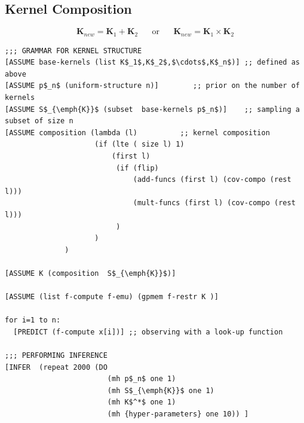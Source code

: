 \documentclass[a0,portrait]{a0poster}
\begin{document}
\begin{multicols}{3}
\subsection*{Kernel Composition}
\begin{equation*}
\mathbf{K}_{new} = \mathbf{K}_1 + \mathbf{K}_2 \;\;\;\;\;\;\text{or}\;\;\;\;\;\; \mathbf{K}_{new} = \mathbf{K}_1 \times \mathbf{K}_2 
\end{equation*}
\begin{minipage}{\linewidth}
\small
\begin{lstlisting}[frame=single,label=alg:structureVent,caption=Venture Code for Bayesian GP Structure Learning,mathescape]
;;; GRAMMAR FOR KERNEL STRUCTURE
[ASSUME base-kernels (list K$_1$,K$_2$,$\cdots$,K$_n$)] ;; defined as above
[ASSUME p$_n$ (uniform-structure n)]        ;; prior on the number of kernels
[ASSUME S$_{\emph{K}}$ (subset  base-kernels p$_n$)]    ;; sampling a subset of size n
[ASSUME composition (lambda (l)          ;; kernel composition
                     (if (lte ( size l) 1)
                         (first l)
                          (if (flip)
                              (add-funcs (first l) (cov-compo (rest l)))
                              (mult-funcs (first l) (cov-compo (rest l)))
                          )
                     )
              )

[ASSUME K (composition  S$_{\emph{K}}$)]

[ASSUME (list f-compute f-emu) (gpmem f-restr K )]

for i=1 to n:
  [PREDICT (f-compute x[i])] ;; observing with a look-up function

;;; PERFORMING INFERENCE  
[INFER  (repeat 2000 (DO 
                        (mh p$_n$ one 1) 
                        (mh S$_{\emph{K}}$ one 1) 
                        (mh K$^*$ one 1) 
                        (mh {hyper-parameters} one 10)) ]


\end{lstlisting}

\end{minipage}



 

\end{multicols}
\end{document}
